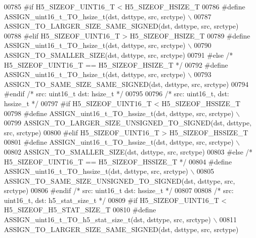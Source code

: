 \begin{DoxyCode}
00785 \textcolor{preprocessor}{#if H5\_SIZEOF\_UINT16\_T < H5\_SIZEOF\_HSIZE\_T}
00786 \textcolor{preprocessor}{    #define ASSIGN\_uint16\_t\_TO\_hsize\_t(dst, dsttype, src, srctype) \(\backslash\)}
00787 \textcolor{preprocessor}{        ASSIGN\_TO\_LARGER\_SIZE\_SAME\_SIGNED(dst, dsttype, src, srctype)}
00788 \textcolor{preprocessor}{#elif H5\_SIZEOF\_UINT16\_T > H5\_SIZEOF\_HSIZE\_T}
00789 \textcolor{preprocessor}{    #define ASSIGN\_uint16\_t\_TO\_hsize\_t(dst, dsttype, src, srctype) \(\backslash\)}
00790 \textcolor{preprocessor}{        ASSIGN\_TO\_SMALLER\_SIZE(dst, dsttype, src, srctype)}
00791 \textcolor{preprocessor}{#else }\textcolor{comment}{/* H5\_SIZEOF\_UINT16\_T == H5\_SIZEOF\_HSIZE\_T */}\textcolor{preprocessor}{}
00792 \textcolor{preprocessor}{    #define ASSIGN\_uint16\_t\_TO\_hsize\_t(dst, dsttype, src, srctype) \(\backslash\)}
00793 \textcolor{preprocessor}{        ASSIGN\_TO\_SAME\_SIZE\_SAME\_SIGNED(dst, dsttype, src, srctype)}
00794 \textcolor{preprocessor}{#endif }\textcolor{comment}{/* src: uint16\_t dst: hsize\_t */}\textcolor{preprocessor}{}
00795 
00796 \textcolor{comment}{/* src: uint16\_t, dst: hssize\_t */}
00797 \textcolor{preprocessor}{#if H5\_SIZEOF\_UINT16\_T < H5\_SIZEOF\_HSSIZE\_T}
00798 \textcolor{preprocessor}{    #define ASSIGN\_uint16\_t\_TO\_hssize\_t(dst, dsttype, src, srctype) \(\backslash\)}
00799 \textcolor{preprocessor}{        ASSIGN\_TO\_LARGER\_SIZE\_UNSIGNED\_TO\_SIGNED(dst, dsttype, src, srctype)}
00800 \textcolor{preprocessor}{#elif H5\_SIZEOF\_UINT16\_T > H5\_SIZEOF\_HSSIZE\_T}
00801 \textcolor{preprocessor}{    #define ASSIGN\_uint16\_t\_TO\_hssize\_t(dst, dsttype, src, srctype) \(\backslash\)}
00802 \textcolor{preprocessor}{        ASSIGN\_TO\_SMALLER\_SIZE(dst, dsttype, src, srctype)}
00803 \textcolor{preprocessor}{#else }\textcolor{comment}{/* H5\_SIZEOF\_UINT16\_T == H5\_SIZEOF\_HSSIZE\_T */}\textcolor{preprocessor}{}
00804 \textcolor{preprocessor}{    #define ASSIGN\_uint16\_t\_TO\_hssize\_t(dst, dsttype, src, srctype) \(\backslash\)}
00805 \textcolor{preprocessor}{        ASSIGN\_TO\_SAME\_SIZE\_UNSIGNED\_TO\_SIGNED(dst, dsttype, src, srctype)}
00806 \textcolor{preprocessor}{#endif }\textcolor{comment}{/* src: uint16\_t dst: hssize\_t */}\textcolor{preprocessor}{}
00807 
00808 \textcolor{comment}{/* src: uint16\_t, dst: h5\_stat\_size\_t */}
00809 \textcolor{preprocessor}{#if H5\_SIZEOF\_UINT16\_T < H5\_SIZEOF\_H5\_STAT\_SIZE\_T}
00810 \textcolor{preprocessor}{    #define ASSIGN\_uint16\_t\_TO\_h5\_stat\_size\_t(dst, dsttype, src, srctype) \(\backslash\)}
00811 \textcolor{preprocessor}{        ASSIGN\_TO\_LARGER\_SIZE\_SAME\_SIGNED(dst, dsttype, src, srctype)}

\end{DoxyCode}
